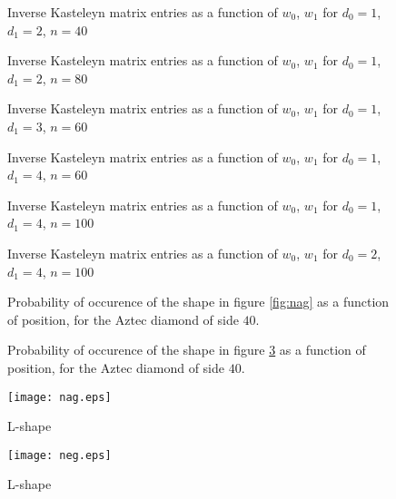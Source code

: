 \documentclass[10pt,reqno]{amsart}
\theoremstyle{plain}
\theoremstyle{definition}
\theoremstyle{remark}
\begin{document}
\begin{figure}
\centering 
{}
\caption{Inverse Kasteleyn matrix entries as a function of $w_0$, $w_1$
for $d_0=1$, $d_1=2$, $n=40$}\label{fig:ha} 
\end{figure}
\begin{figure}
\centering
{}
\caption{Inverse Kasteleyn matrix entries as a function of $w_0$, $w_1$
for $d_0=1$, $d_1=2$, $n=80$} 
\end{figure}
\begin{figure}
\centering
{}
\caption{Inverse Kasteleyn matrix entries as a function of $w_0$, $w_1$
for $d_0=1$, $d_1=3$, $n=60$}
\end{figure}
\begin{figure}
\centering
{}
\caption{Inverse Kasteleyn matrix entries as a function of $w_0$, $w_1$
for $d_0=1$, $d_1=4$, $n=60$}
\end{figure}
\begin{figure}
\centering
{}
\caption{Inverse Kasteleyn matrix entries as a function of $w_0$, $w_1$
for $d_0=1$, $d_1=4$, $n=100$}
\end{figure}
\begin{figure}
\centering 
{}
\caption{Inverse Kasteleyn matrix entries as a function of $w_0$, $w_1$
for $d_0=2$, $d_1=4$, $n=100$}\label{fig:he}
\end{figure}
\begin{figure}
\centering
{}
\caption{Probability of occurence of the shape in figure \ref{fig:nag}
as a function of position, for the Aztec diamond of side $40$.}
\end{figure}
\begin{figure}
\centering
{}
\caption{Probability of occurence of the shape in figure \ref{fig:neg}
as a function of position, for the Aztec diamond of side $40$.}
\end{figure}
\begin{figure}
        \begin{minipage}[b]{0.5\linewidth}
                \centering \texttt{[image: nag.eps]}
                \caption{L-shape}\label{fig:nag}
        \end{minipage}
        \begin{minipage}[b]{0.5\linewidth}
                \texttt{[image: neg.eps]}
                \caption{L-shape} \label{fig:neg}   
        \end{minipage}
\end{figure}
\end{document}
